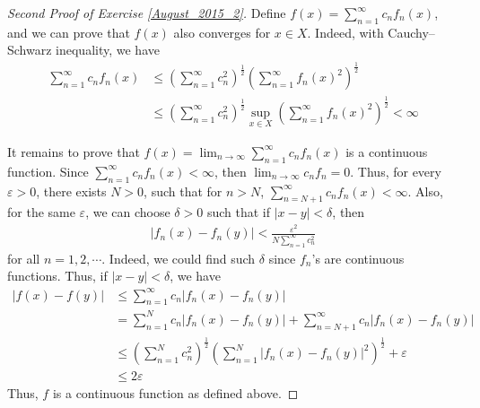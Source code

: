 \documentclass[11pt]{article}
\theoremstyle{definition}
\numberwithin{equation}{subsection}
\begin{document}
\begin{proof}[Second Proof of Exercise \ref{August_2015_2}]
Define $  f(x) = \sum_{n=1}^\infty c_n f_n(x)$, and we can prove that $f(x)$ also converges for $x\in X$. Indeed, with Cauchy–Schwarz inequality, we have
\begin{align*}
    \sum_{n=1}^\infty c_nf_n(x) & \leq \left(\sum_{n=1}^\infty c_n^2\right)^{\frac{1}{2}} \left(\sum_{n=1}^\infty f_n(x)^2\right)^{\frac{1}{2}} \\
    & \leq \left(\sum_{n=1}^\infty c_n^2\right)^{\frac{1}{2}} \sup_{x\in X} \left(\sum_{n=1}^\infty f_n(x)^2\right)^{\frac{1}{2}} < \infty
\end{align*}

It remains to prove that $  f(x) = \lim_{n\to\infty}\sum_{n=1}^\infty c_n f_n(x)$ is a continuous function. Since $  \sum_{n=1}^\infty c_nf_n(x) < \infty$, then $  \lim_{n\to\infty} c_n f_n = 0$. Thus, for every $\varepsilon > 0$, there exists $N > 0$, such that for $n > N$, $  \sum_{n=N+1}^\infty c_nf_n(x) < \infty$. Also, for the same $\varepsilon$, we can choose $\delta > 0$ such that if $|x - y| < \delta$, then 
\begin{align*}
    \left|f_n(x) - f_n(y)\right| < \frac{\varepsilon^2}{N \sum_{n=1}^\infty c_n^2}
\end{align*}
for all $n = 1,2,\cdots$. Indeed, we could find such $\delta$ since $f_n$'s are continuous functions. Thus, if $|x - y| < \delta$, we have 
\begin{align*}
    \left|f(x) - f(y)\right| & \leq \sum_{n=1}^\infty c_n \left|f_n(x) - f_n(y)\right|\\
    & = \sum_{n=1}^N c_n \left|f_n(x) - f_n(y)\right| + \sum_{n=N+1}^\infty c_n \left|f_n(x) - f_n(y)\right|\\
    & \leq \left(\sum_{n=1}^N c_n^2\right)^{\frac{1}{2}} \left(\sum_{n=1}^N \left|f_n(x) - f_n(y)\right|^2\right)^{\frac{1}{2}} + \varepsilon \\
    & \leq 2 \varepsilon 
\end{align*}
Thus, $f$ is a continuous function as defined above.
\end{proof}

\medskip
\end{document}
